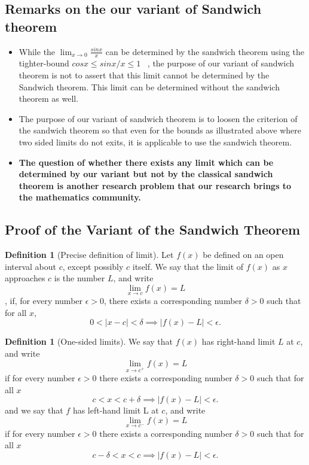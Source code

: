 \documentclass[a4paper,twoside,12pt]{article}
\theoremstyle{plain}
\theoremstyle{definition}
\newtheorem{definition}[theorem]{Definition}
\theoremstyle{theorem}
\begin{document}
{ \subsection{Remarks on the our variant of Sandwich theorem}
 \begin{itemize}
 \item  While the \(\displaystyle \lim_{x \to 0} \frac{sinx}{x}\) can be determined by the sandwich theorem using the tighter-bound $cosx \leq sinx/x \leq 1$ ~\cite{boules}, the purpose of our variant of sandwich theorem is not to assert that this limit cannot be determined by the Sandwich theorem. This limit can be determined without the sandwich theorem as well.

 \item The purpose of our variant of sandwich theorem is to loosen the criterion of the sandwich theorem so that even for the bounds as illustrated above where two sided limits do not exits, it is applicable to use the sandwich theorem.

\item \textbf{The question of whether there exists any limit which can be determined by our variant but not by the classical sandwich theorem is another research problem that our research brings to the mathematics community.}
 \end{itemize}

\vspace{5mm}
 \subsection{Proof of the Variant of the Sandwich Theorem}

 \begin{definition}[Precise definition of limit] \cite{thomas}
     Let $f(x)$ be defined on an open interval about $c$, except possibly $c$ itself. We say that the limit of $f(x)$ as $x$ approaches $c$ is the number $L$, and write $$\lim_{x \to c} f(x)=L$$,
     if, for every number $\epsilon > 0$, there exists a corresponding number $\delta >0$ such that for all $x$, \[0<|x-c|< \delta \implies |f(x)-L|<\epsilon .\]
 \end{definition}

 \begin{definition}[One-sided limits] \cite{thomas}
 We say that $f(x)$ has right-hand limit $L$ at $c$, and write $$\lim_{x \to c^+} f(x) = L$$
 if for every number $\epsilon >0$ there exists a corresponding number $\delta >0$ such that for all $x$ $$c<x<c+\delta \implies |f(x) - L| < \epsilon .$$ and we say that $f$ has left-hand limit L at $c$, and write $$\lim_{x \to c^-} f(x) = L$$
 if for every number $\epsilon >0$ there exists a corresponding number $\delta >0$ such that for all $x$ $$c - \delta<x<c \implies |f(x) - L| < \epsilon .$$
 \end{definition}
\vspace{5mm}

}
\end{document}
